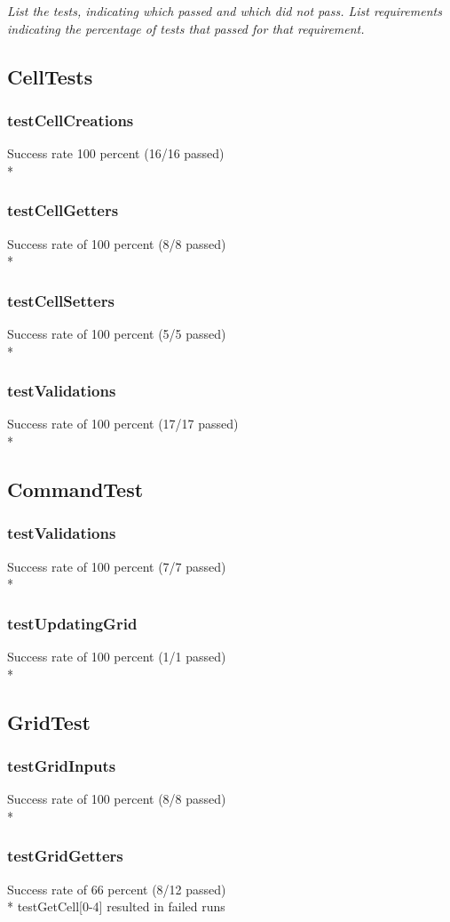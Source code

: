 \documentclass[12pt]{article}
\begin{document}
{\it
List the tests, indicating which passed and which did not pass.
List requirements indicating the percentage of tests that passed for that requirement.

\subsection{CellTests}
\subsubsection{testCellCreations}
Success rate 100 percent (16/16 passed) \\*

\subsubsection{testCellGetters}
Success rate of 100 percent (8/8 passed) \\*

\subsubsection{testCellSetters}
Success rate of 100 percent (5/5 passed) \\*

\subsubsection{testValidations}
Success rate of 100 percent (17/17 passed) \\*

\subsection{CommandTest}
\subsubsection{testValidations}
Success rate of 100 percent (7/7 passed) \\*

\subsubsection{testUpdatingGrid}
Success rate of 100 percent (1/1 passed) \\*

\subsection{GridTest}

\subsubsection{testGridInputs}
Success rate of 100 percent (8/8 passed) \\*
\subsubsection{testGridGetters}
Success rate of 66 percent (8/12 passed) \\*
testGetCell[0-4] resulted in failed runs
}
\end{document}
